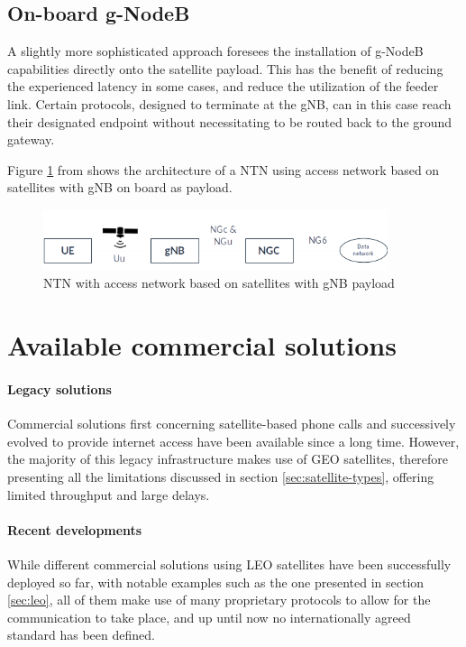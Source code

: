 \subsection{On-board g-NodeB}
\label{sec:onboard-gnb}
A slightly more sophisticated approach foresees the installation of g-NodeB capabilities directly onto the satellite payload. This has the benefit of reducing the experienced latency in some cases, and reduce the utilization of the feeder link. Certain protocols, designed to terminate at the \ac{gNB}, can in this case reach their designated endpoint without necessitating to be routed back to the ground gateway.

Figure \ref{fig:ntn-gnb-onboard} from \cite{3gpp-tr-38.811} shows the architecture of a \ac{NTN} using access network based on satellites with \ac{gNB} on board as payload.

\begin{figure}[ht]
    \centering
    \includegraphics[width=0.9\textwidth]{res/ntn-bent-pipe.png}
    \caption{NTN with access network based on satellites with gNB payload \cite{3gpp-tr-38.811}}
    \label{fig:ntn-gnb-onboard}
\end{figure}

\section{Available commercial solutions}
\paragraph{Legacy solutions}
Commercial solutions first concerning satellite-based phone calls and successively evolved to provide internet access have been available since a long time. However, the majority of this legacy infrastructure makes use of \ac{GEO} satellites, therefore presenting all the limitations discussed in section \ref{sec:satellite-types}, offering limited throughput and large delays.

\paragraph{Recent developments}
While different commercial solutions using \ac{LEO} satellites have been successfully deployed so far, with notable examples such as the one presented in section \ref{sec:leo}, all of them make use of many proprietary protocols to allow for the communication to take place, and up until now no internationally agreed standard has been defined. 